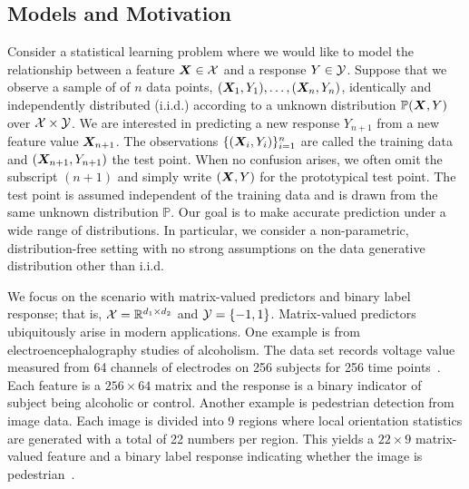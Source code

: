 \documentclass[12pt]{article}
\begin{document}
\subsection{Models and Motivation}
Consider a statistical learning problem where we would like to model the relationship between a feature $\bm X \in \mathcal{X}$ and a response $Y\in\mathcal{Y}$. Suppose that we observe a sample of of $n$ data points, $(\bm X_1,Y_1),\ldots,(\bm X_n,Y_n)$, identically and independently distributed (i.i.d.) according to a unknown distribution $\mathbb{P}(\bm X,Y)$ over $\mathcal{X}\times \mathcal{Y}$. We are interested in predicting a new response $Y_{n+1}$ from a new feature value $\bm X_{n+1}$. The observations $\{(\bm X_i,Y_i)\}_{i=1}^n$ are called the training data and $(\bm X_{n+1},Y_{n+1})$ the test point. When no confusion arises, we often omit the subscript $(n+1)$ and simply write $(\bm X,Y)$ for the prototypical test point. The test point is assumed independent of the training data and is drawn from the same unknown distribution $\mathbb{P}$. Our goal is to make accurate prediction under a wide range of distributions. In particular, we consider a non-parametric, distribution-free setting with no strong assumptions on the data generative distribution other than i.i.d. 




We focus on the scenario with matrix-valued predictors and binary label response; that is, $\mathcal{X}=\mathbb{R}^{d_1\times d_2}$ and $\mathcal{Y}=\{-1,1\}$. Matrix-valued predictors ubiquitously arise in modern applications. One example is from electroencephalography studies of alcoholism. The data set records voltage value measured from 64 channels of electrodes on 256 subjects for 256 time points~\citep{zhou2014regularized}. Each feature is a $256\times 64$ matrix and the response is a binary indicator of subject being alcoholic or control. Another example is pedestrian detection from image data. Each image is divided into 9 regions where local orientation statistics are generated with a total of 22 numbers per region. This yields a $22 \times 9$ matrix-valued feature and a binary label response indicating whether the image is pedestrian~\citep{Shashua2004PedestrianDF}. 
\end{document}
